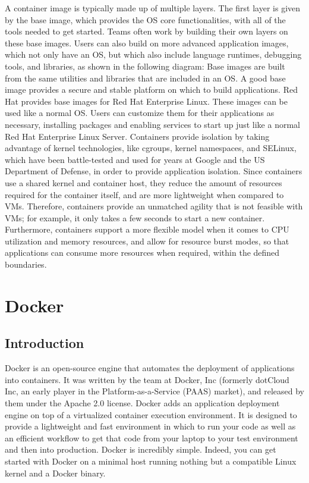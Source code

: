 A container image is typically made up of multiple layers.
The first layer is given by the base image, which provides the OS core functionalities, with
all of the tools needed to get started. Teams often work by building their own layers on
these base images. Users can also build on more advanced application images, which not
only have an OS, but which also include language runtimes, debugging tools, and libraries,
as shown in the following diagram:
Base images are built from the same utilities and libraries that are included in an OS. A
good base image provides a secure and stable platform on which to build applications. Red
Hat provides base images for Red Hat Enterprise Linux. These images can be used like a
normal OS. Users can customize them for their applications as necessary, installing
packages and enabling services to start up just like a normal Red Hat Enterprise Linux
Server.
Containers provide isolation by taking advantage of kernel technologies, like cgroups,
kernel namespaces, and SELinux, which have been battle-tested and used for years at
Google and the US Department of Defense, in order to provide application isolation.
Since containers use a shared kernel and container host, they reduce the amount of
resources required for the container itself, and are more lightweight when compared to
VMs. Therefore, containers provide an unmatched agility that is not feasible with VMs; for
example, it only takes a few seconds to start a new container. Furthermore, containers
support a more flexible model when it comes to CPU utilization and memory resources,
and allow for resource burst modes, so that applications can consume more resources when
required, within the defined boundaries.

\section{Docker}
\subsection{Introduction}
Docker is an open-source engine that automates the deployment of
applications into containers. It was written by the team at Docker, Inc
(formerly dotCloud Inc, an early player in the Platform-as-a-Service
(PAAS) market), and released by them under the Apache 2.0 license.
Docker adds an application deployment
engine on top of a virtualized container execution environment. It is
designed to provide a lightweight and fast environment in which to run your
code as well as an efficient workflow to get that code from your laptop to
your test environment and then into production. Docker is incredibly
simple. Indeed, you can get started with Docker on a minimal host running
nothing but a compatible Linux kernel and a Docker binary. 

